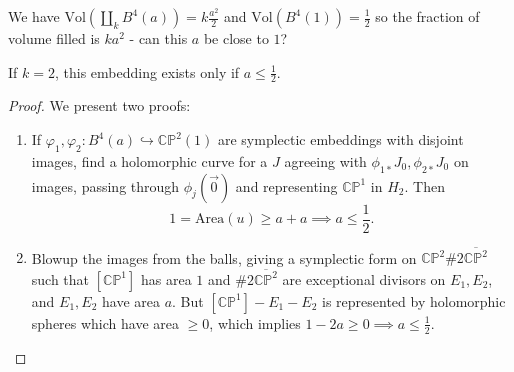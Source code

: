 We have $\text{Vol}(\amalg_k B^4(a))=k \frac{a^2}{2}$ and $\text{Vol}(B^4(1)) = \frac{1}{2}$ so the fraction of volume filled is $ka^2$ - can this $a$ be close to $1$?

\begin{theorem}

If $k=2$, this embedding exists only if $a\le \frac{1}{2}$.

\end{theorem}

\begin{proof}
We present two proofs:

\begin{enumerate}
\item If $\varphi_1, \varphi_2: B^{4}(a)\hookrightarrow \mathbb{CP}^{2}(1)$ are symplectic embeddings with disjoint images, find a holomorphic curve for a $J$ agreeing with $\phi_{1*}J_0, \phi_{2*} J_0$ on images, passing through $\phi_j(\vec{0})$ and representing $\mathbb{CP}^1$ in $H_2$. Then
\[
1=\text{Area}(u) \ge a+a \implies a \le \frac{1}{2}.
\]
\item Blowup the images from the balls, giving a symplectic form on $\mathbb{CP}^2 \# 2 \overline{\mathbb{CP}^2}$ such that $[\mathbb{CP}^1]$ has area $1$ and $\# 2 \overline{\mathbb{CP}^2}$ are exceptional divisors on $E_1,E_2$, and $E_1, E_2$ have area $a$. But $[\mathbb{CP}^1]-E_1-E_2$ is represented by holomorphic spheres which have area $\ge 0$, which implies $1-2a\ge 0\implies a\le \frac{1}{2}$.
\end{enumerate}
\end{proof}